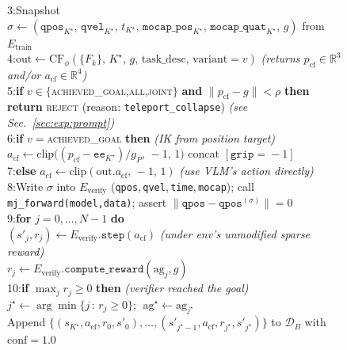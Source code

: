 \begin{figure}[t]
{{\quad\textsc{3:}\;Snapshot $\sigma\!\leftarrow\!(\texttt{qpos}_{K^\star},\,\texttt{qvel}_{K^\star},\,t_{K^\star},\,\texttt{mocap\_pos}_{K^\star},\,\texttt{mocap\_quat}_{K^\star},\,g)$ from $E_{\text{train}}$\\
\quad\textsc{4:}\;$\text{out}\!\leftarrow\!\mathrm{CF}_\phi(\{F_k\},\,K^\star,\,g,\,\text{task\_desc},\,\text{variant}\!=\!v)$
\hfill\textit{(returns $p_{\text{cf}}\!\in\!\mathbb{R}^3$ and/or $a_{\text{cf}}\!\in\!\mathbb{R}^4$)}\\
\quad\textsc{5:}\;\textbf{if} $v\!\in\!\{$\textsc{achieved\_goal},\textsc{all},\textsc{joint}$\}$ \textbf{and} $\|p_{\text{cf}}\!-\!g\|\!<\!\rho$ \textbf{then}\\
\quad\quad\;\textbf{return} \textsc{reject} (reason: \texttt{teleport\_collapse}) \hfill\textit{(see Sec.~\ref{sec:exp:prompt})}\\
\quad\textsc{6:}\;\textbf{if} $v\!=\!$\textsc{achieved\_goal} \textbf{then} \hfill\textit{(IK from position target)}\\
\quad\quad\;$a_{\text{cf}}\!\leftarrow\!\mathrm{clip}\bigl((p_{\text{cf}}\!-\!\texttt{ee}_{K^\star})/g_P,\,-1,\,1\bigr)$
concat $[\texttt{grip}\!=\!-1]$\\
\quad\textsc{7:}\;\textbf{else} $a_{\text{cf}}\!\leftarrow\!\mathrm{clip}(\text{out}.a_{\text{cf}},\,-1,\,1)$ \hfill\textit{(use VLM's action directly)}\\
\quad\textsc{8:}\;Write $\sigma$ into $E_{\text{verify}}$ (\texttt{qpos},\,\texttt{qvel},\,\texttt{time},\,\texttt{mocap});
call \texttt{mj\_forward(model,data)}; assert $\|\texttt{qpos}\!-\!\texttt{qpos}^{(\sigma)}\|\!=\!0$\\
\quad\textsc{9:}\;\textbf{for} $j\!=\!0,\dots,N\!-\!1$ \textbf{do}\\
\quad\quad\;$(s'_j, r_j)\!\leftarrow\!E_{\text{verify}}.\texttt{step}(a_{\text{cf}})$ \hfill\textit{(under env's unmodified sparse reward)}\\
\quad\quad\;$r_j\!\leftarrow\!E_{\text{verify}}.\texttt{compute\_reward}(\text{ag}_j, g)$\\
\quad\textsc{10:}\;\textbf{if} $\max_j r_j\!\ge\!0$ \textbf{then} \hfill\textit{(verifier reached the goal)}\\
\quad\quad\;$j^\star\!\leftarrow\!\arg\min\{j\,:\,r_j\!\ge\!0\}$;
$\;\text{ag}^\star\!\leftarrow\!\text{ag}_{j^\star}$\\
\quad\quad\;Append $\{(s_{K^\star},a_{\text{cf}},r_0,s'_0),\dots,(s'_{j^\star-1},a_{\text{cf}},r_{j^\star},s'_{j^\star})\}$ to $\mathcal{D}_B$ with $\text{conf}\!=\!1.0$\\
}}
\end{figure}
